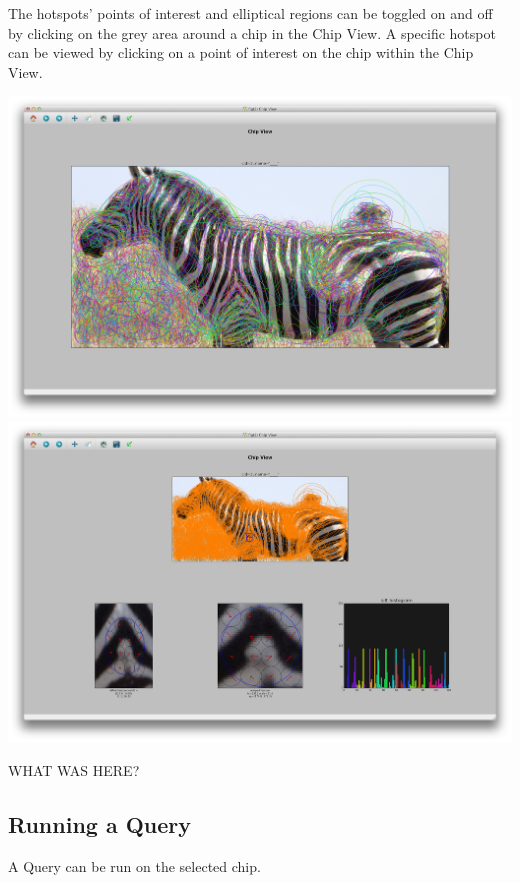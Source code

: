 \documentclass[a4paper,10pt]{article}
\begin{document}
        The hotspots' points of interest and elliptical regions can be
        toggled on and off by clicking on the grey area around a chip in the Chip View.
	A specific hotspot can be viewed by clicking on a point of interest on the chip within the Chip View.
        \begin{center}
            \includegraphics[scale=0.1]{images/chip-ellipse.png}
            \includegraphics[scale=0.1]{images/chip-hotspot.png}
        \end{center}

        
        \begin{center}
          WHAT WAS HERE?
        \end{center}

    \subsection{Running a Query}
        A Query can be run on the selected chip.
\end{document}
